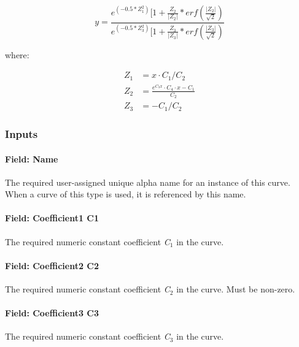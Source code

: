 \begin{equation}
y = \frac{{{e^{( - 0.5*Z_1^2)}}[1 + \frac{{{Z_2}}}{{\left| {{Z_2}} \right|}}*erf\left( {\frac{{\left| {{Z_2}} \right|}}{{\sqrt 2 }}} \right)}}{{{e^{( - 0.5*Z_3^2)}}[1 + \frac{{{Z_3}}}{{\left| {{Z_3}} \right|}}*erf\left( {\frac{{\left| {{Z_3}} \right|}}{{\sqrt 2 }}} \right)}}
\end{equation}

where:

\begin{align*}
  Z_1 &= x \cdot C_1 / C_2 \\
  Z_2 &= \frac{e^{C_3 x} \cdot C_4 \cdot x - C_1}{C_2} \\
  Z_3 &= -C_1/C_2
\end{align*}

\subsubsection{Inputs}\label{inputs-13-008}

\paragraph{Field: Name}\label{field-name-13-006}

The required user-assigned unique alpha name for an instance of this curve. When a curve of this type is used, it is referenced by this name.

\paragraph{Field: Coefficient1 C1}\label{field-coefficient1-c1}

The required numeric constant coefficient \emph{C\(_{1}\)} in the curve.

\paragraph{Field: Coefficient2 C2}\label{field-coefficient2-c2}

The required numeric constant coefficient \emph{C\(_{2}\)} in the curve. Must be non-zero.

\paragraph{Field: Coefficient3 C3}\label{field-coefficient3-c3}

The required numeric constant coefficient \emph{C\(_{3}\)} in the curve.

